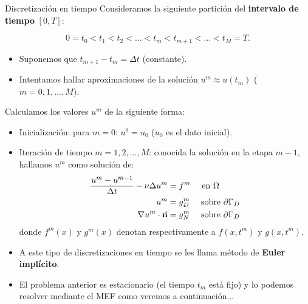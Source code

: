 \documentclass[9pt, dvipsnames,]{beamer}
\begin{document}
\begin{frame}{Discretización en tiempo}
  \small
Consideramos la siguiente partición del \textbf{intervalo de tiempo} $[0,T]$:

$$
0=t_0 < t_1 < t_2 < \dots < t_m < t_{m+1} < \dots  < t_M=T.
$$
\begin{itemize}
  \item Suponemos que $t_{m+1}-t_m = \Delta t$ (constante).
  \item Intentamos hallar aproximaciones de la solución $u^m\approx u(t_m)$ ($m=0,1,...,M$).
\end{itemize}
Calculamos los valores $u^m$ de la siguiente forma:
\begin{itemize}
  \item Inicialización: para $m=0$: $u^0=u_0$ ($u_0$ es el dato inicial).
  \item Iteración de tiempo $m=1,2,\dots,M$: conocida la solución en
    la etapa $m-1$, hallamos $u^m$ como solución de:
    \begin{align}
      \label{eq:1}
     \frac{u^m-u^{m-1}}{\Delta t} - \nu\Delta u^m &= f^m \quad\text{ en } \Omega
     \\
     u^m &= g_D^m \quad\text{ sobre } \partial\Gamma_D
           \\
   \nabla u^m\cdot\vec{\mathbf{n}} &= g_N^m \quad\text{ sobre } \partial\Gamma_D
   \end{align}
   donde $f^m(x)$ y $g^m(x)$ denotan respectivamente a $f(x,t^m)$ y $g(x,t^m)$.
   \item A este tipo de discretizaciones en tiempo se les llama método de \textbf{Euler implícito}.
   \item El problema anterior es estacionario (el tiempo $t_m$ está
     fijo) y lo podemos resolver mediante el MEF como veremos a
     continuación...

\end{itemize}

\end{frame}
\end{document}
